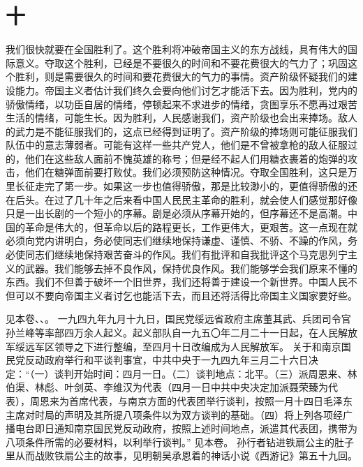 \section*{十}

我们很快就要在全国胜利了。这个胜利将冲破帝国主义的东方战线，具有伟大的国际意义。夺取这个胜利，已经是不要很久的时间和不要花费很大的气力了；巩固这个胜利，则是需要很久的时间和要花费很大的气力的事情。资产阶级怀疑我们的建设能力。帝国主义者估计我们终久会要向他们讨乞才能活下去。因为胜利，党内的骄傲情绪，以功臣自居的情绪，停顿起来不求进步的情绪，贪图享乐不愿再过艰苦生活的情绪，可能生长。因为胜利，人民感谢我们，资产阶级也会出来捧场。敌人的武力是不能征服我们的，这点已经得到证明了。资产阶级的捧场则可能征服我们队伍中的意志薄弱者。可能有这样一些共产党人，他们是不曾被拿枪的敌人征服过的，他们在这些敌人面前不愧英雄的称号；但是经不起人们用糖衣裹着的炮弹的攻击，他们在糖弹面前要打败仗。我们必须预防这种情况。夺取全国胜利，这只是万里长征走完了第一步。如果这一步也值得骄傲，那是比较渺小的，更值得骄傲的还在后头。在过了几十年之后来看中国人民民主革命的胜利，就会使人们感觉那好像只是一出长剧的一个短小的序幕。剧是必须从序幕开始的，但序幕还不是高潮。中国的革命是伟大的，但革命以后的路程更长，工作更伟大，更艰苦。这一点现在就必须向党内讲明白，务必使同志们继续地保持谦虚、谨慎、不骄、不躁的作风，务必使同志们继续地保持艰苦奋斗的作风。我们有批评和自我批评这个马克思列宁主义的武器。我们能够去掉不良作风，保持优良作风。我们能够学会我们原来不懂的东西。我们不但善于破坏一个旧世界，我们还将善于建设一个新世界。中国人民不但可以不要向帝国主义者讨乞也能活下去，而且还将活得比帝国主义国家要好些。


\begin{maonote}
见本卷、、。
一九四九年九月十九日，国民党绥远省政府主席董其武、兵团司令官孙兰峰等率部四万余人起义。起义部队自一九五〇年二月二十一日起，在人民解放军绥远军区领导之下进行整编，至四月十日改编成为人民解放军。
关于和南京国民党反动政府举行和平谈判事宜，中共中央于一九四九年三月二十六日决定：“（一）谈判开始时间：四月一日。（二）谈判地点：北平。（三）派周恩来、林伯渠、林彪、叶剑英、李维汉为代表（四月一日中共中央决定加派聂荣臻为代表），周恩来为首席代表，与南京方面的代表团举行谈判，按照一月十四日毛泽东主席对时局的声明及其所提八项条件以为双方谈判的基础。（四）将上列各项经广播电台即日通知南京国民党反动政府，按照上述时间地点，派遣其代表团，携带为八项条件所需的必要材料，以利举行谈判。”
见本卷。
孙行者钻进铁扇公主的肚子里从而战败铁扇公主的故事，见明朝吴承恩着的神话小说《西游记》第五十九回。
\end{maonote}
